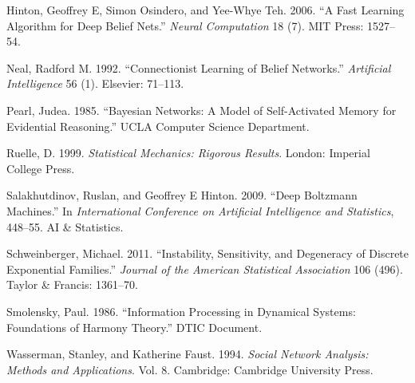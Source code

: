 \documentclass[]{article}
\theoremstyle{definition}
\begin{document}
\hypertarget{ref-hinton2006fast}{}
Hinton, Geoffrey E, Simon Osindero, and Yee-Whye Teh. 2006. ``A Fast
Learning Algorithm for Deep Belief Nets.'' \emph{Neural Computation} 18
(7). MIT Press: 1527--54.

\hypertarget{ref-neal1992connectionist}{}
Neal, Radford M. 1992. ``Connectionist Learning of Belief Networks.''
\emph{Artificial Intelligence} 56 (1). Elsevier: 71--113.

\hypertarget{ref-pearl985bayesian}{}
Pearl, Judea. 1985. ``Bayesian Networks: A Model of Self-Activated
Memory for Evidential Reasoning.'' UCLA Computer Science Department.

\hypertarget{ref-ruelle1999statistical}{}
Ruelle, D. 1999. \emph{Statistical Mechanics: Rigorous Results}. London:
Imperial College Press.

\hypertarget{ref-salakhutdinov2009deep}{}
Salakhutdinov, Ruslan, and Geoffrey E Hinton. 2009. ``Deep Boltzmann
Machines.'' In \emph{International Conference on Artificial Intelligence
and Statistics}, 448--55. AI \& Statistics.

\hypertarget{ref-schweinberger2011instability}{}
Schweinberger, Michael. 2011. ``Instability, Sensitivity, and Degeneracy
of Discrete Exponential Families.'' \emph{Journal of the American
Statistical Association} 106 (496). Taylor \& Francis: 1361--70.

\hypertarget{ref-smolensky1986information}{}
Smolensky, Paul. 1986. ``Information Processing in Dynamical Systems:
Foundations of Harmony Theory.'' DTIC Document.

\hypertarget{ref-wasserman1994social}{}
Wasserman, Stanley, and Katherine Faust. 1994. \emph{Social Network
Analysis: Methods and Applications}. Vol. 8. Cambridge: Cambridge
University Press.
\end{document}
